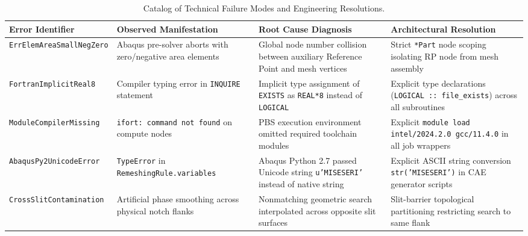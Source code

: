 \begin{table}[htbp]
\centering
\fontsize{7.0}{8.2}\selectfont
\setlength{\tabcolsep}{2.5pt}
\renewcommand{\arraystretch}{0.85}
\caption{Catalog of Technical Failure Modes and Engineering Resolutions.}
\label{tab:app_failure_modes}
\begin{tabularx}{\textwidth}{lXXX}
\toprule
\textbf{Error Identifier} & \textbf{Observed Manifestation} & \textbf{Root Cause Diagnosis} & \textbf{Architectural Resolution} \\
\midrule
\texttt{ErrElemAreaSmallNegZero} & Abaqus pre-solver aborts with zero/negative area elements & Global node number collision between auxiliary Reference Point and mesh vertices & Strict \texttt{*Part} node scoping isolating RP node from mesh assembly \\
\midrule
\texttt{FortranImplicitReal8} & Compiler typing error in \texttt{INQUIRE} statement & Implicit type assignment of \texttt{EXISTS} as \texttt{REAL*8} instead of \texttt{LOGICAL} & Explicit type declarations (\texttt{LOGICAL :: file\_exists}) across all subroutines \\
\midrule
\texttt{ModuleCompilerMissing} & \texttt{ifort: command not found} on compute nodes & PBS execution environment omitted required toolchain modules & Explicit \texttt{module load intel/2024.2.0 gcc/11.4.0} in all job wrappers \\
\midrule
\texttt{AbaqusPy2UnicodeError} & \texttt{TypeError} in \texttt{RemeshingRule.variables} & Abaqus Python 2.7 passed Unicode string \texttt{u'MISESERI'} instead of native string & Explicit ASCII string conversion \texttt{str('MISESERI')} in CAE generator scripts \\
\midrule
\texttt{CrossSlitContamination} & Artificial phase smoothing across physical notch flanks & Nonmatching geometric search interpolated across opposite slit surfaces & Slit-barrier topological partitioning restricting search to same flank \\
\bottomrule
\end{tabularx}
\end{table}
